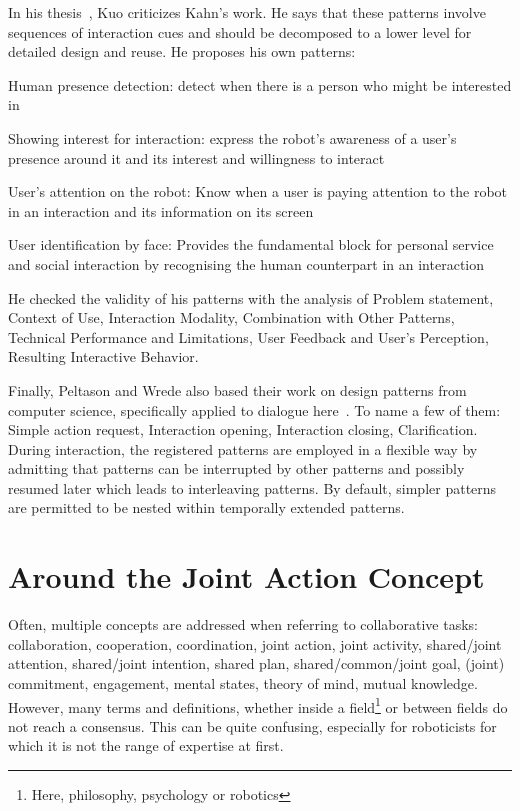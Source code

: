 \documentclass[a4paper,11pt,twoside]{StyleThese}
\begin{document}
In his thesis~\cite{kuo_2012_designing}, Kuo criticizes Kahn’s work. He says that these patterns involve sequences of interaction cues and should be decomposed to a lower level for detailed design and reuse. He proposes his own patterns:
\begin{enumerate*}
	\item Human presence detection: detect when there is a person who might be interested in
	\item Showing interest for interaction: express the robot’s awareness of a user’s presence around it and its interest and willingness to interact
	\item User’s attention on the robot: Know when a user is paying attention to the robot in an interaction and its information on its screen
	\item User identification by face: Provides the fundamental block for personal service and social interaction by recognising the human counterpart in an interaction
\end{enumerate*}
He checked the validity of his patterns with the analysis of Problem statement, Context of Use, Interaction Modality, Combination with Other Patterns, Technical Performance and Limitations, User Feedback and User’s Perception, Resulting Interactive Behavior.

Finally, Peltason and Wrede also based their work on design patterns from computer science, specifically applied to dialogue here~\cite{peltason_2010_pamini}. To name a few of them: Simple action request, Interaction opening, Interaction closing, Clarification. During interaction, the registered patterns are employed in a flexible way by admitting that patterns can be interrupted by other patterns and possibly resumed later which leads to interleaving patterns. By default, simpler patterns are permitted to be nested within temporally extended patterns.

\section{Around the Joint Action Concept}
Often, multiple concepts are addressed when referring to collaborative tasks: collaboration, cooperation, coordination, joint action, joint activity, shared/joint attention, shared/joint intention, shared plan, shared/common/joint goal, (joint) commitment, engagement, mental states, theory of mind, mutual knowledge. However, many terms and definitions, whether inside a field\footnote{Here, philosophy, psychology or robotics} or between fields do not reach a consensus. This can be quite confusing, especially for roboticists for which it is not the range of expertise at first.
\end{document}
